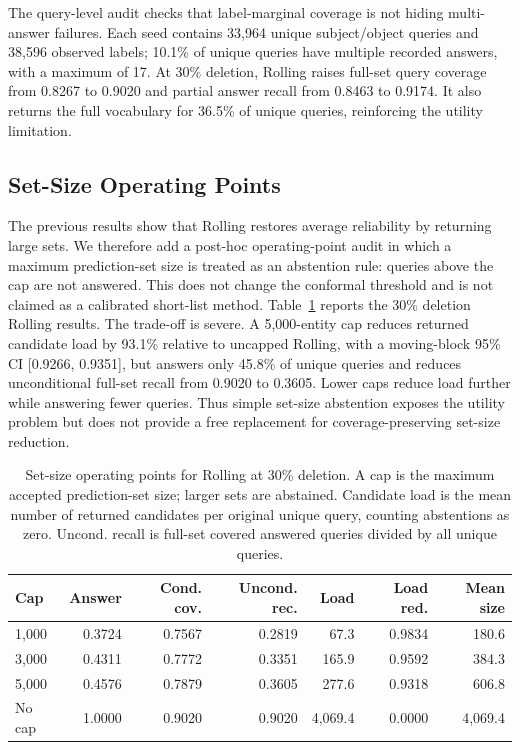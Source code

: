 \documentclass[information,article,submit,oneauthor,pdftex]{Definitions/mdpi}
\begin{document}
The query-level audit checks that label-marginal coverage is not hiding
multi-answer failures. Each seed contains 33,964 unique subject/object queries
and 38,596 observed labels; 10.1\% of unique queries have multiple recorded
answers, with a maximum of 17. At 30\% deletion, Rolling raises full-set query
coverage from 0.8267 to 0.9020 and partial answer recall from 0.8463 to 0.9174.
It also returns the full vocabulary for 36.5\% of unique queries, reinforcing
the utility limitation.

\subsection{Set-Size Operating Points}

The previous results show that Rolling restores average reliability by
returning large sets. We therefore add a post-hoc operating-point audit in which
a maximum prediction-set size is treated as an abstention rule: queries above
the cap are not answered. This does not change the conformal threshold and is
not claimed as a calibrated short-list method. Table~\ref{tab:set-size-utility}
reports the 30\% deletion Rolling results. The trade-off is severe. A
5,000-entity cap reduces returned candidate load by 93.1\% relative to uncapped
Rolling, with a moving-block 95\% CI [0.9266, 0.9351], but answers only 45.8\%
of unique queries and reduces unconditional full-set recall from 0.9020 to
0.3605. Lower caps reduce load further while answering fewer queries. Thus
simple set-size abstention exposes the utility problem but does not provide a
free replacement for coverage-preserving set-size reduction.

\begin{table}[t]
\centering
\caption{Set-size operating points for Rolling at 30\% deletion. A cap is the
maximum accepted prediction-set size; larger sets are abstained. Candidate load
is the mean number of returned candidates per original unique query, counting
abstentions as zero. Uncond. recall is full-set covered answered queries divided
by all unique queries.}
\label{tab:set-size-utility}
\scriptsize
\setlength{\tabcolsep}{2pt}
\begin{tabular}{lrrrrrr}
\toprule
Cap & Answer & Cond. cov. & Uncond. rec. & Load & Load red. & Mean size\\
\midrule
1,000 & 0.3724 & 0.7567 & 0.2819 & 67.3 & 0.9834 & 180.6\\
3,000 & 0.4311 & 0.7772 & 0.3351 & 165.9 & 0.9592 & 384.3\\
5,000 & 0.4576 & 0.7879 & 0.3605 & 277.6 & 0.9318 & 606.8\\
No cap & 1.0000 & 0.9020 & 0.9020 & 4,069.4 & 0.0000 & 4,069.4\\
\bottomrule
\end{tabular}
\end{table}
\end{document}

